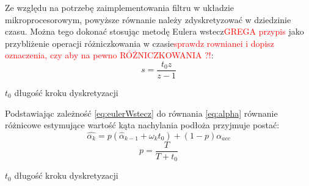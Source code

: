 Ze względu na potrzebę zaimplementowania filtru w układzie mikroprocesorowym, powyższe równanie należy zdyskretyzować w dziedzinie czasu. Można tego dokonać stosując metodę Eulera wstecz\textcolor{red}{GREGA przypis} jako przybliżenie operacji różniczkowania w czasie\textcolor{red}{sprawdz rownianei i dopisz oznaczenia, czy aby na pewno RÓŻNICZKOWANIA ?!}:
\begin{equation}
    s=\frac{t_0z}{z-1}
    \label{eq:eulerWstecz}
\end{equation}
\begin{eqwhere}[2cm]
	\item[$t_{0}$] długość kroku dyskretyzacji
\end{eqwhere}

Podstawiając zależność \ref{eq:eulerWstecz} do równania \ref{eq:alpha} równanie różnicowe estymujące wartość kąta nachylania podłoża przyjmuje postać:
\begin{equation}
    \hat{\alpha_{k}} = p(\hat{\alpha}_{k-1} + \omega_{k}t_0) + (1-p)\alpha_{acc}
\end{equation}
\begin{equation}
    p = \frac{T}{T + t_0}
\end{equation}
\begin{eqwhere}[2cm]
	\item[$t_{0}$] długość kroku dyskretyzacji
\end{eqwhere}
